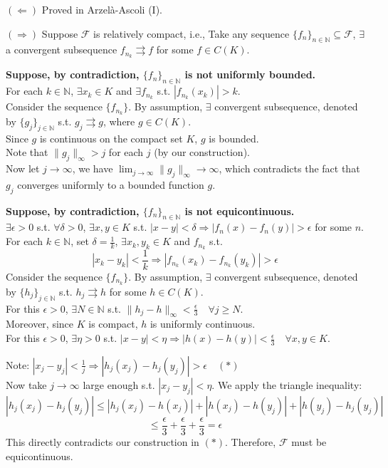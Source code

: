 \begin{pfbox}
    $(\Leftarrow)$ Proved in Arzel\`a-Ascoli (I).
    
    $(\Rightarrow)$ Suppose $\mathcal{F}$ is relatively compact, i.e., Take any sequence $\{f_n\}_{n \in \mathbb{N}} \subseteq \mathcal{F}$, $\exists$ a convergent subsequence $f_{n_k} \rightrightarrows f$ for some $f \in C(K)$.

    \textbf{Suppose, by contradiction, $\{f_n\}_{n \in \mathbb{N}}$ is not uniformly bounded.} \\
    For each $k \in \mathbb{N}$, $\exists x_k \in K$ and $\exists f_{n_k}$ s.t. $|f_{n_k}(x_k)| > k$. \\
    Consider the sequence $\{f_{n_k}\}$. By assumption, $\exists$ convergent subsequence, denoted by $\{g_j\}_{j \in \mathbb{N}}$ s.t. $g_j \rightrightarrows g$, where $g \in C(K)$. \\
    Since $g$ is continuous on the compact set $K$, $g$ is bounded. \\
    Note that $\|g_j\|_\infty > j$ for each $j$ (by our construction). \\
    Now let $j \to \infty$, we have $\lim_{j \to \infty} \|g_j\|_\infty \to \infty$, which contradicts the fact that $g_j$ converges uniformly to a bounded function $g$.

    \vspace{1em}
    \textbf{Suppose, by contradiction, $\{f_n\}_{n \in \mathbb{N}}$ is not equicontinuous.} \\
    $\exists \epsilon > 0$ s.t. $\forall \delta > 0$, $\exists x, y \in K$ s.t. $|x - y| < \delta \Rightarrow |f_n(x) - f_n(y)| > \epsilon$ for some $n$. \\
    For each $k \in \mathbb{N}$, set $\displaystyle \delta = \frac{1}{k}$, $\exists x_k, y_k \in K$ and $f_{n_k}$ s.t.
    \[ |x_k - y_k| < \frac{1}{k} \Rightarrow |f_{n_k}(x_k) - f_{n_k}(y_k)| > \epsilon \]
    Consider the sequence $\{f_{n_k}\}$. By assumption, $\exists$ convergent subsequence, denoted by $\{h_j\}_{j \in \mathbb{N}}$ s.t. $h_j \rightrightarrows h$ for some $h \in C(K)$. \\
    For this $\epsilon > 0$, $\exists N \in \mathbb{N}$ s.t. $\displaystyle \|h_j - h\|_\infty < \frac{\epsilon}{3} \quad \forall j \ge N$. \\
    Moreover, since $K$ is compact, $h$ is uniformly continuous. \\
    For this $\epsilon > 0$, $\exists \eta > 0$ s.t. $\displaystyle |x - y| < \eta \Rightarrow |h(x) - h(y)| < \frac{\epsilon}{3} \quad \forall x, y \in K$.

    \vspace{1em}
    Note: $\displaystyle |x_j - y_j| < \frac{1}{j} \Rightarrow |h_j(x_j) - h_j(y_j)| > \epsilon \quad (*)$ \\
    Now take $j \to \infty$ large enough s.t. $|x_j - y_j| < \eta$. We apply the triangle inequality:
    \[ |h_j(x_j) - h_j(y_j)| \le |h_j(x_j) - h(x_j)| + |h(x_j) - h(y_j)| + |h(y_j) - h_j(y_j)| \]
    \[ \le \displaystyle \frac{\epsilon}{3} + \frac{\epsilon}{3} + \frac{\epsilon}{3} = \epsilon \]
    This directly contradicts our construction in $(*)$. Therefore, $\mathcal{F}$ must be equicontinuous.
\end{pfbox}


